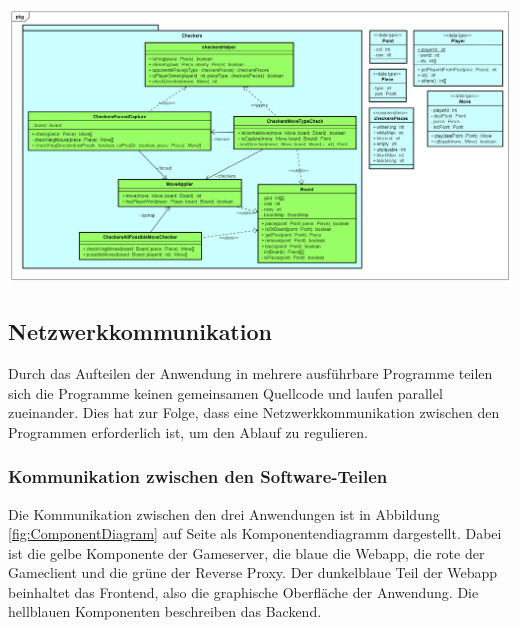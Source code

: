 \documentclass[12pt,a4paper,bibliography=totocnumbered,listof=totocnumbered]{article}
\begin{document}
\vspace{1em}
\begin{minipage}{\linewidth}
	\centering
	\includegraphics[width=1.0\linewidth]{pics/GameLogic.png}
	\label{fig:GameLogic}
\end{minipage}



\subsection{Netzwerkkommunikation}
\label{chap:Networkcom}
Durch das Aufteilen der Anwendung in mehrere ausführbare Programme teilen sich die Programme keinen gemeinsamen Quellcode und laufen parallel zueinander. 
Dies hat zur Folge, dass eine Netzwerkkommunikation zwischen den Programmen erforderlich ist, um den Ablauf zu regulieren.

\subsubsection{Kommunikation zwischen den Software-Teilen}
Die Kommunikation zwischen den drei Anwendungen ist in Abbildung \ref{fig:ComponentDiagram} auf Seite \pageref{fig:ComponentDiagram} als 
Komponentendiagramm dargestellt. Dabei ist die gelbe Komponente der Gameserver, die blaue die Webapp, die rote der Gameclient und die grüne der Reverse Proxy.
Der dunkelblaue Teil der Webapp beinhaltet das Frontend, also die graphische Oberfläche der Anwendung.
Die hellblauen Komponenten beschreiben das Backend. 
\end{document}
